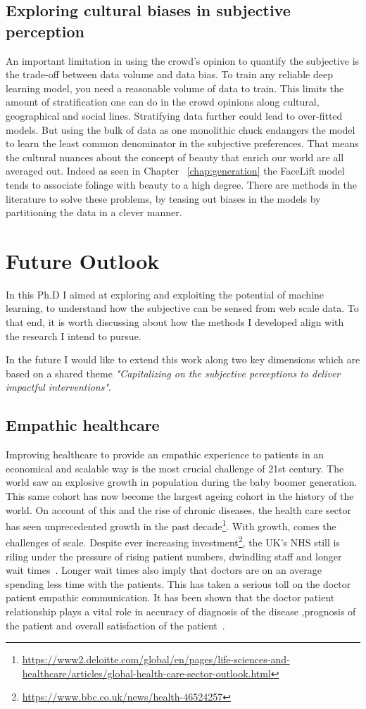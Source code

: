 \subsection{Exploring cultural biases in subjective perception}
An important limitation in using the crowd's opinion to quantify the subjective is the trade-off between data volume and data bias. 
To train any reliable deep learning model, you need a reasonable volume of data to train. This limits the amount of stratification one can do in the crowd opinions along cultural, geographical and social lines. 
Stratifying data further could lead to over-fitted models. But using the bulk of data as one monolithic chuck endangers the model to learn the least common denominator in the subjective preferences. That means the cultural nuances about the concept of beauty that enrich our world are all averaged out. Indeed as seen in Chapter ~\ref{chap:generation} the FaceLift model tends to associate foliage with beauty to a high degree. 
There are methods in the literature to solve these problems, by teasing out biases in the models by partitioning the data in a clever manner.

\section{Future Outlook}
In this Ph.D I aimed at exploring and exploiting the potential of machine learning, to understand how the subjective can be sensed from web scale data. To that end, it is worth discussing about how the methods I developed align with the research I intend to pursue. 

In the future I would like to extend this work along two key dimensions which are based on a shared theme \textit{"Capitalizing on the subjective perceptions to deliver impactful interventions"}.

\subsection{Empathic healthcare}
Improving healthcare to provide an empathic experience to patients in an economical and scalable way is the most crucial challenge of 21st century. 
The world saw an explosive growth in population during the baby boomer generation. This same cohort has now become the largest ageing cohort in the history of the world. On account of this and the rise of chronic diseases, the health care sector has seen unprecedented growth in the past decade\footnote{\url{https://www2.deloitte.com/global/en/pages/life-sciences-and-healthcare/articles/global-health-care-sector-outlook.html}}. With growth, comes the challenges of scale. Despite ever increasing investment\footnote{\url{https://www.bbc.co.uk/news/health-46524257}}, the UK's NHS still is riling under the pressure of rising patient numbers, dwindling staff and longer wait times~\cite{mayor2018nhs}. Longer wait times also imply that doctors are on an average spending less time with the patients. This has taken a serious toll on the doctor patient empathic communication. It has been shown that the doctor patient relationship plays a vital role in accuracy of diagnosis of the disease ,prognosis of the patient and overall satisfaction of the patient~\cite{jagosh2011importance,bensing1991doctor}.

